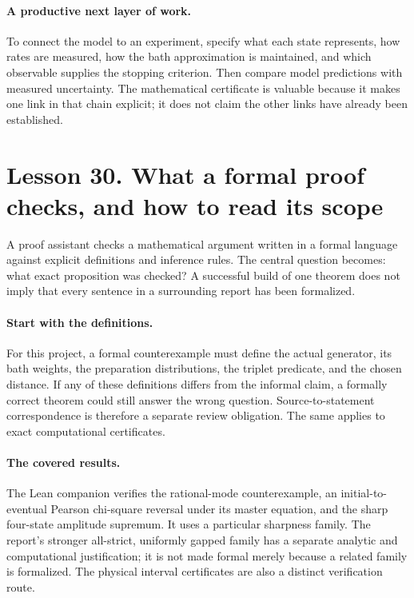 \documentclass[11pt]{article}
\begin{document}
\paragraph{A productive next layer of work.}
To connect the model to an experiment, specify what each state represents,
how rates are measured, how the bath approximation is maintained, and which
observable supplies the stopping criterion. Then compare model predictions
with measured uncertainty. The mathematical certificate is valuable because
it makes one link in that chain explicit; it does not claim the other links
have already been established.

\clearpage
\section*{Lesson 30. What a formal proof checks, and how to read its scope}
A proof assistant checks a mathematical argument written in a formal
language against explicit definitions and inference rules. The central
question becomes: what exact proposition was checked? A successful build
of one theorem does not imply that every sentence in a surrounding report
has been formalized.

\paragraph{Start with the definitions.}
For this project, a formal counterexample must define the actual generator,
its bath weights, the preparation distributions, the triplet predicate,
and the chosen distance. If any of these definitions differs from the
informal claim, a formally correct theorem could still answer the wrong
question. Source-to-statement correspondence is therefore a separate
review obligation. The same applies to exact computational certificates.

\paragraph{The covered results.}
The Lean companion verifies the rational-mode counterexample, an
initial-to-eventual Pearson chi-square reversal under its master equation,
and the sharp four-state amplitude supremum. It uses a particular sharpness
family. The report's stronger all-strict, uniformly gapped family has a
separate analytic and computational justification; it is not made formal
merely because a related family is formalized. The physical interval
certificates are also a distinct verification route.
\end{document}

